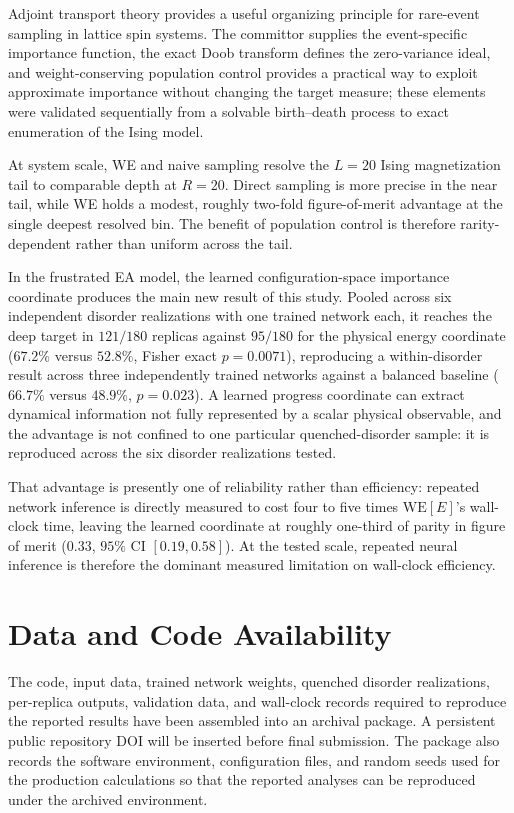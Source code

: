 \documentclass[a4paper,fleqn]{cas-sc}
\newcommand{\WE}{\mathrm{WE}}
\begin{document}
Adjoint transport theory provides a useful organizing principle for rare-event sampling in
lattice spin systems. The committor supplies the event-specific importance function, the exact
Doob transform defines the zero-variance ideal, and weight-conserving population control
provides a practical way to exploit approximate importance without changing the target
measure; these elements were validated sequentially from a solvable birth--death process to
exact enumeration of the Ising model.

At system scale, WE and naive sampling resolve the $L=20$ Ising magnetization tail to
comparable depth at $R=20$. Direct sampling is more precise in the near tail, while WE holds a
modest, roughly two-fold figure-of-merit advantage at the single deepest resolved bin. The
benefit of population control is therefore rarity-dependent rather than uniform across the
tail.

In the frustrated EA model, the learned configuration-space importance coordinate produces the
main new result of this study. Pooled across six independent disorder realizations with one
trained network each, it reaches the deep target in $121/180$ replicas against $95/180$ for the
physical energy coordinate ($67.2\%$ versus $52.8\%$, Fisher exact $p=0.0071$), reproducing a
within-disorder result across three independently trained networks against a balanced baseline
($66.7\%$ versus $48.9\%$, $p=0.023$). A learned progress coordinate can extract dynamical
information not fully represented by a scalar physical observable, and the advantage is not
confined to one particular quenched-disorder sample: it is reproduced across the six disorder
realizations tested.

That advantage is presently one of reliability rather than efficiency: repeated network
inference is directly measured to cost four to five times $\WE[E]$'s wall-clock time, leaving
the learned coordinate at roughly one-third of parity in figure of merit ($0.33$, $95\%$ CI
$[0.19,0.58]$). At the tested scale, repeated neural inference is therefore the dominant measured
limitation on wall-clock efficiency.

\section*{Data and Code Availability}
The code, input data, trained network weights, quenched disorder realizations, per-replica
outputs, validation data, and wall-clock records required to reproduce the reported results have
been assembled into an archival package. A persistent public repository DOI will be inserted
before final submission. The package also records the software environment, configuration files,
and random seeds used for the production calculations so that the reported analyses can be
reproduced under the archived environment.
\end{document}
